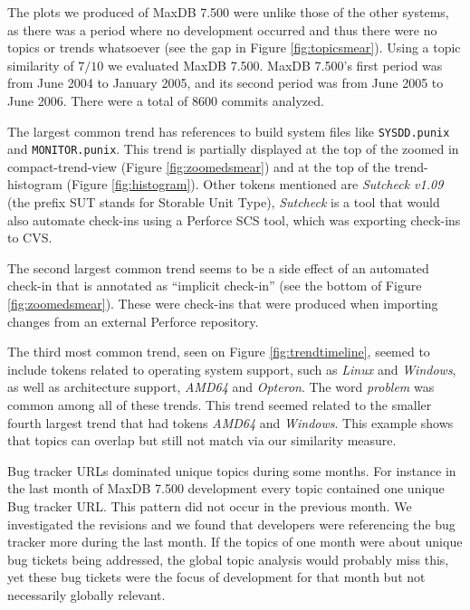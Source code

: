 \documentclass[times, 10pt,twocolumn]{article}
\begin{document}



The plots we produced of MaxDB 7.500 were unlike those of the other
systems, as there was a period where no development occurred and thus
there were no topics or trends whatsoever (see the gap in Figure
\ref{fig:topicsmear}). Using a topic similarity of $7/10$ we evaluated
MaxDB 7.500. MaxDB 7.500's first period was from June 2004 to January
2005, and its second period was from June 2005 to June 2006. There
were a total of $8 600$ commits analyzed.


The largest common trend has references to build system files like
\texttt{SYSDD.punix} and \texttt{MONITOR.punix}.  This trend is
partially displayed at the top of the zoomed in compact-trend-view
(Figure \ref{fig:zoomedsmear}) and at the top of the trend-histogram
(Figure \ref{fig:histogram}).  Other tokens mentioned are
\emph{Sutcheck v1.09} (the prefix SUT stands for Storable Unit Type),
\emph{Sutcheck} is a tool that would also automate check-ins using a Perforce SCS
tool, which was exporting check-ins to CVS.

The second largest common trend seems to be a side effect of an
automated check-in that is annotated as ``implicit check-in'' (see
the bottom of Figure \ref{fig:zoomedsmear}). These were check-ins that
were produced when importing changes from an external Perforce
repository.

The third most common trend, seen on Figure \ref{fig:trendtimeline},
seemed to include tokens related to operating system support, such as
\emph{Linux} and \emph{Windows}, as well as architecture support, \emph{AMD64} and
\emph{Opteron}. The word \emph{problem} was common among all of these
trends. This trend seemed related to the smaller fourth largest trend
that had tokens \emph{AMD64} and \emph{Windows}. This example shows that
topics can overlap but still not match via our similarity measure.


Bug tracker URLs dominated unique topics during some months. For
instance in the last month of MaxDB 7.500 development every topic
contained one unique Bug tracker URL. This pattern did not occur in the
previous month. We investigated the revisions and we found that
developers were referencing the bug tracker more during the last
month.  If the topics of one month were about unique bug tickets being
addressed, the global topic analysis would probably miss this, yet
these bug tickets were the focus of development for that month but not
necessarily globally relevant.
\end{document}
